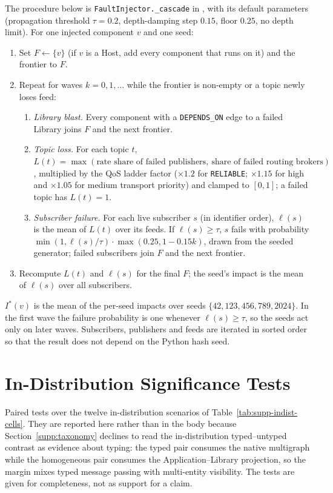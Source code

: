 \documentclass[preprint,3p]{elsarticle}
\begin{document}
\noindent The procedure below is \texttt{FaultInjector.\_cascade} in , with its default parameters (propagation threshold $\tau = 0.2$, depth-damping step $0.15$, floor $0.25$, no depth limit). For one injected component $v$ and one seed:
\begin{enumerate}
    \item Set $F \leftarrow \{v\}$ (if $v$ is a Host, add every component that runs on it) and the frontier to $F$.
    \item Repeat for waves $k = 0, 1, \dots$ while the frontier is non-empty or a topic newly loses feed:
    \begin{enumerate}
        \item \emph{Library blast.} Every component with a \texttt{DEPENDS\_ON} edge to a failed Library joins $F$ and the next frontier.
        \item \emph{Topic loss.} For each topic $t$, $L(t) = \max(\text{rate share of failed publishers},\ \text{share of failed routing brokers})$, multiplied by the QoS ladder factor ($\times 1.2$ for \texttt{RELIABLE}; $\times 1.15$ for high and $\times 1.05$ for medium transport priority) and clamped to $[0, 1]$; a failed topic has $L(t) = 1$.
        \item \emph{Subscriber failure.} For each live subscriber $s$ (in identifier order), $\ell(s)$ is the mean of $L(t)$ over its feeds. If $\ell(s) \ge \tau$, $s$ fails with probability $\min(1, \ell(s)/\tau) \cdot \max(0.25, 1 - 0.15k)$, drawn from the seeded generator; failed subscribers join $F$ and the next frontier.
    \end{enumerate}
    \item Recompute $L(t)$ and $\ell(s)$ for the final $F$; the seed's impact is the mean of $\ell(s)$ over all subscribers.
\end{enumerate}
\noindent $I^*(v)$ is the mean of the per-seed impacts over seeds $\{42, 123, 456, 789, 2024\}$. In the first wave the failure probability is one whenever $\ell(s) \ge \tau$, so the seeds act only on later waves. Subscribers, publishers and feeds are iterated in sorted order so that the result does not depend on the Python hash seed.

\section{In-Distribution Significance Tests}
\label{supp:indist}

Paired tests over the twelve in-distribution scenarios of Table~\ref{tab:supp-indist-cells}. They are reported here rather than in the body because Section~\ref{supp:taxonomy} declines to read the in-distribution typed--untyped contrast as evidence about typing: the typed pair consumes the native multigraph while the homogeneous pair consumes the Application--Library projection, so the margin mixes typed message passing with multi-entity visibility. The tests are given for completeness, not as support for a claim.
\end{document}
